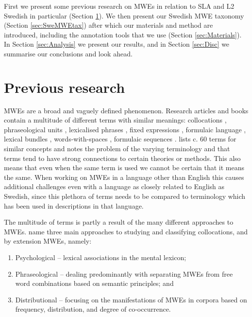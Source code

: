 \documentclass[output=paper,colorlinks,citecolor=brown]{langscibook}
\begin{document}
First we present some previous research on MWEs in relation to SLA and L2 Swedish in particular (Section \ref{sec:PrevRes}). We then present our Swedish MWE taxonomy (Section \ref{sec:SweMWEtax}) after which our materials and method are introduced, including the annotation tools that we use (Section \ref{sec:Materials}). In Section \ref{sec:Analysis} we present our results, and in Section \ref{sec:Disc} we summarise our conclusions and look ahead.

\section{Previous research}\label{sec:PrevRes}
MWEs are a broad and vaguely defined phenomenon. Research articles and books contain a multitude of different terms with similar meanings: collocations \citep[][]{bhalla2019evaluation}, phraseological units \citep[][]{paquot2019phraseological}, lexicalised phrases \citep[][]{Sag:Baldwin:2002}, fixed expressions \citep[][]{moiron2005data}, formulaic language \citep[][]{durrant2018formulaic}, lexical bundles \citep[][] {granger2018formulaic}, words-with-spaces \citep[][]{Sag:Baldwin:2002}, formulaic sequences \citep[][]{wray2000functions,wray2002formulaic}.  \citet{wray2002formulaic} lists c. 60 terms for similar concepts and notes the problem of the varying terminology and that terms tend to have strong connections to certain theories or methods. This also means that even when the same term is used we cannot be certain that it means the same. When working on MWEs in a language other than English this causes additional challenges even with a language as closely related to English as Swedish, since this plethora of terms needs to be compared to terminology which has been used in descriptions in that language.

The multitude of terms is partly a result of the many different approaches to MWEs. \citet{bhalla2019evaluation} name three main approaches to studying and classifying collocations, and by extension MWEs, namely:

\begin{enumerate}
    \item Psychological -- lexical associations in the mental lexicon; 
    \item Phraseological -- dealing predominantly with separating MWEs from free word combinations based on semantic principles; and 
    \item Distributional -- focusing on the manifestations of MWEs in corpora based on frequency, distribution, and degree of co-occurrence. 
\end{enumerate}
\end{document}
